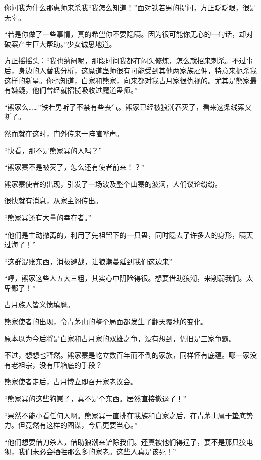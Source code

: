 
\begin{this_body}



你问我为什么那惠师来杀我“我怎么知道！”面对铁若男的提问，方正眨眨眼，很是无辜。

“若是你做了一些事情，真的希望你不要隐瞒。因为很可能你无心的一句话，却对破案产生巨大帮助。”少女诚恳地道。

方正摇摇头：“我也纳闷呢，那段时间我都在闷头修炼，怎么就招来刺杀。不过事后，身边的人替我分析，这魔道蛊师很有可能受到其他两家族雇佣，特意来扼杀我这样的新星。你也知道，白家和熊家，向来都对我古月家很仇视的。尤其是熊家最有嫌疑，他们曾经就招揽吸收过魔道蛊师。”

“熊家么……”铁若男听了不禁有些丧气。熊家已经被狼潮吞灭了，看来这条线索又断了。

然而就在这时，门外传来一阵喧哗声。

“快看，那不是熊家寨的人吗？”

“熊家寨不是被灭了，怎么还有使者前来！？”

熊家寨使者的出现，引发了一场波及整个山寨的波澜，人们议论纷纷。

很快就有消息，从家主阁传出。

“熊家寨还有大量的幸存者。”

“他们是主动撤离的，利用了先祖留下的一只蛊，同时隐去了许多人的身形，瞒天过海了！”

“这群混账东西，消极避战，让狼潮蔓延到我们这边来”

“哼，熊家这些人五大三粗，其实心中阴险得很。想要借助狼潮，来削弱我们。太卑鄙了！”

古月族人皆义愤填膺。

熊家使者的出现，令青茅山的整个局面都发生了翻天覆地的变化。

原本以为今后将是白家和古月家的双雄之争，没有想到，仍旧是三家争霸。

不过，想想也释然。熊家寨是屹立数百年而不倒的家族，同样怀有底蕴。哪一家没有老祖宗，没有压箱底的手段？

熊家使者走后，古月博立即召开家老议会。

“熊家寨的这些狗崽子，真不是个东西。居然直接撤退了！”

“果然不能小看任何人啊。熊家寨一直排在我族和白家之后，在青茅山属于垫底势力。但竟然有这样的图谋，今后更要当心。”

“他们想要借刀杀人，借助狼潮来铲除我们。还真被他们得逞了，要不是那只狡电狈，我们未必会牺牲那么多的家老。这些人真是该死！”


\end{this_body}
